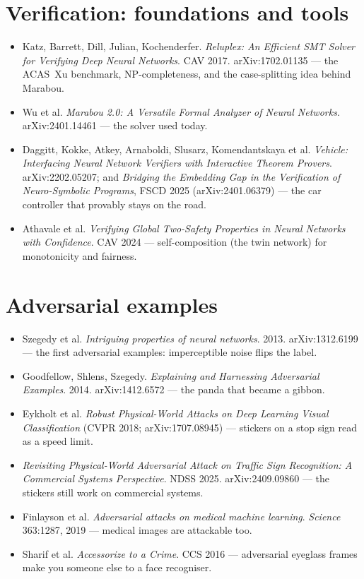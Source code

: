 \documentclass[11pt]{article}
\begin{document}
\section*{Verification: foundations and tools}
\begin{itemize}
  \item Katz, Barrett, Dill, Julian, Kochenderfer. \emph{Reluplex: An Efficient SMT Solver for Verifying Deep Neural Networks}. CAV 2017. arXiv:1702.01135 — the ACAS~Xu benchmark, NP-completeness, and the case-splitting idea behind Marabou.
  \item Wu et al. \emph{Marabou 2.0: A Versatile Formal Analyzer of Neural Networks}. arXiv:2401.14461 — the solver used today.
  \item Daggitt, Kokke, Atkey, Arnaboldi, Slusarz, Komendantskaya et al. \emph{Vehicle: Interfacing Neural Network Verifiers with Interactive Theorem Provers}. arXiv:2202.05207; and \emph{Bridging the Embedding Gap in the Verification of Neuro-Symbolic Programs}, FSCD 2025 (arXiv:2401.06379) — the car controller that provably stays on the road.
  \item Athavale et al. \emph{Verifying Global Two-Safety Properties in Neural Networks with Confidence}. CAV 2024 — self-composition (the twin network) for monotonicity and fairness.
\end{itemize}
\section*{Adversarial examples}
\begin{itemize}
  \item Szegedy et al. \emph{Intriguing properties of neural networks}. 2013. arXiv:1312.6199 — the first adversarial examples: imperceptible noise flips the label.
  \item Goodfellow, Shlens, Szegedy. \emph{Explaining and Harnessing Adversarial Examples}. 2014. arXiv:1412.6572 — the panda that became a gibbon.
  \item Eykholt et al. \emph{Robust Physical-World Attacks on Deep Learning Visual Classification} (CVPR 2018; arXiv:1707.08945) — stickers on a stop sign read as a speed limit.
  \item \emph{Revisiting Physical-World Adversarial Attack on Traffic Sign Recognition: A Commercial Systems Perspective}. NDSS 2025. arXiv:2409.09860 — the stickers still work on commercial systems.
  \item Finlayson et al. \emph{Adversarial attacks on medical machine learning}. \emph{Science} 363:1287, 2019 — medical images are attackable too.
  \item Sharif et al. \emph{Accessorize to a Crime}. CCS 2016 — adversarial eyeglass frames make you someone else to a face recogniser.
\end{itemize}
\end{document}
